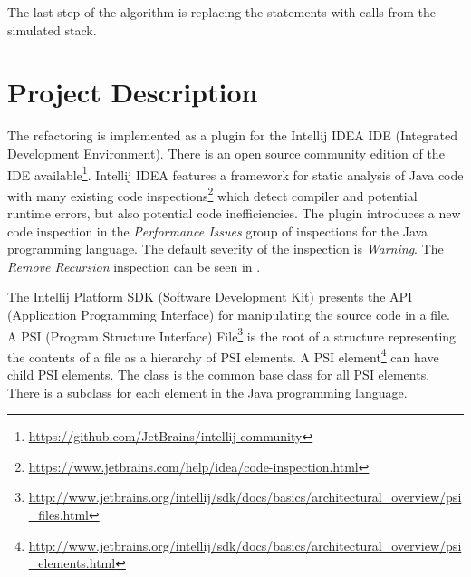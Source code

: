 The last step of the algorithm is replacing the  statements with  calls from the simulated stack.

\nocite{llvm}
\nocite{cfg}

\section{Project Description}

The refactoring is implemented as a plugin for the Intellij IDEA IDE (Integrated Development Environment).
 There is an open source community edition of the IDE
available\footnote{\url{https://github.com/JetBrains/intellij-community}}. Intellij IDEA features a framework for
static analysis of Java code with many existing code
inspections\footnote{\url{https://www.jetbrains.com/help/idea/code-inspection.html}} which detect compiler and potential
runtime errors, but also potential code inefficiencies. The plugin introduces a new code inspection in the
\textit{Performance Issues} group of inspections for the Java programming language. The default severity of the inspection is
\textit{Warning}. The \textit{Remove Recursion} inspection can be seen in .

The Intellij Platform SDK\cite{sdk} (Software Development Kit)
presents the API (Application Programming Interface) for manipulating
the source code in a file. A PSI (Program Structure Interface)
File\footnote{\url{http://www.jetbrains.org/intellij/sdk/docs/basics/architectural_overview/psi_files.html}} is the root
of a structure representing the contents of a file as a hierarchy of PSI elements. A PSI
element\footnote{\url{http://www.jetbrains.org/intellij/sdk/docs/basics/architectural_overview/psi_elements.html}} can
have child PSI elements. The  class is the common base class for all PSI elements. There is a
 subclass for each element in the Java programming language.


